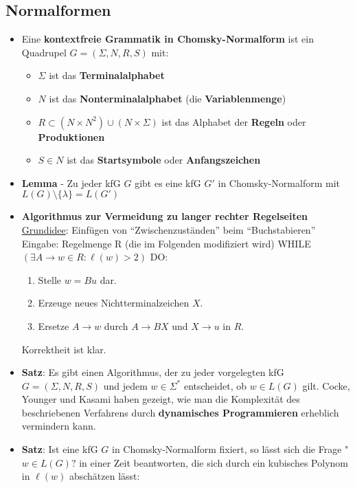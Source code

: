\documentclass[12pt, a4paper]{article}
\begin{document}
	\subsection{Normalformen}
	\begin{itemize}
		
		\item Eine \textbf{kontextfreie Grammatik in Chomsky-Normalform} ist ein Quadrupel $G=(\Sigma,N,R,S)$ mit:
		\begin{itemize}
			\item $\Sigma$ ist das \textbf{Terminalalphabet}
			\item $N$ ist das \textbf{Nonterminalalphabet} (die \textbf{Variablenmenge})
			
			\item $R\subset (N\times N^{2})\cup(N\times\Sigma)$ ist das Alphabet der \textbf{Regeln} oder \textbf{Produktionen}
			\item $S\in N$ ist das \textbf{Startsymbole} oder \textbf{Anfangszeichen}
		\end{itemize}
	
		\item \textbf{Lemma} - Zu jeder kfG $G$ gibt es eine kfG $G'$ in Chomsky-Normalform mit $L(G)\setminus\{\lambda\}=L(G')$
		
		\item \textbf{Algorithmus zur Vermeidung zu langer rechter Regelseiten}
			\subitem \underline{Grundidee}: Einfügen von “Zwischenzuständen” beim “Buchstabieren”
			\subitem Eingabe: Regelmenge R (die im Folgenden modifiziert wird)
			\subitem WHILE $(\exists A\rightarrow w\in R : \ell(w) > 2)$ DO:
			\begin{enumerate}
				\item Stelle $w = Bu$ dar.
				\item Erzeuge neues Nichtterminalzeichen $X$.
				\item Ersetze $A\rightarrow w$ durch $A\rightarrow BX$ und $X\rightarrow u$ in $R$.
			\end{enumerate}
			\subitem Korrektheit ist klar.
			
		\item \textbf{Satz}: Es gibt einen Algorithmus, der zu jeder vorgelegten kfG $G=(\Sigma,N,R,S)$	und jedem $w\in\Sigma^{*}$ entscheidet, ob $w\in L(G)$ gilt.
			\subitem Cocke, Younger und Kasami haben gezeigt, wie man die Komplexität des beschriebenen Verfahrens durch \textbf{dynamisches Programmieren} erheblich vermindern kann.
		
		\item \textbf{Satz}: Ist eine kfG $G$ in Chomsky-Normalform fixiert, so lässt sich die Frage "$w\in L(G) ?$ in einer Zeit beantworten, die sich durch ein kubisches Polynom in $\ell(w)$ abschätzen lässt:
		

\end{itemize}
\end{document}
